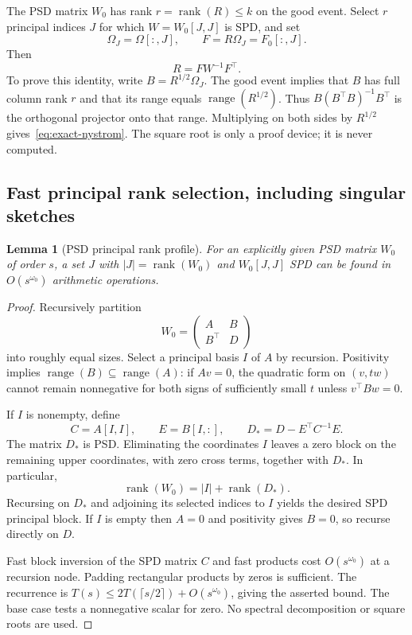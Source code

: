 \documentclass[11pt,a4paper]{article}
\newcommand{\rank}{\operatorname{rank}}
\newcommand{\range}{\operatorname{range}}
\newtheorem{lemma}[theorem]{Lemma}
\theoremstyle{definition}
\theoremstyle{remark}
\begin{document}
The PSD matrix $W_0$ has rank $r=\rank(R)\le k$ on the good event. Select $r$ principal indices $J$ for which $W=W_0[J,J]$ is SPD, and set
\[
 \Omega_J=\Omega[:,J],\qquad F=R\Omega_J=F_0[:,J].
\]
Then
\begin{equation}
 R=FW^{-1}F^\top. \label{eq:exact-nystrom}
\end{equation}
To prove this identity, write $B=R^{1/2}\Omega_J$. The good event implies that $B$ has full column rank $r$ and that its range equals $\range(R^{1/2})$. Thus $B(B^\top B)^{-1}B^\top$ is the orthogonal projector onto that range. Multiplying on both sides by $R^{1/2}$ gives~\eqref{eq:exact-nystrom}. The square root is only a proof device; it is never computed.

\subsection{Fast principal rank selection, including singular sketches}
\begin{lemma}[PSD principal rank profile]
\label{lem:rankprofile}
For an explicitly given PSD matrix $W_0$ of order $s$, a set $J$ with $|J|=\rank(W_0)$ and $W_0[J,J]$ SPD can be found in $O(s^{\omega_0})$ arithmetic operations.
\end{lemma}
\begin{proof}
Recursively partition
\[
 W_0=\begin{pmatrix}A&B\\B^\top&D\end{pmatrix}
\]
into roughly equal sizes. Select a principal basis $I$ of $A$ by recursion. Positivity implies $\range(B)\subseteq\range(A)$: if $Av=0$, the quadratic form on $(v,tw)$ cannot remain nonnegative for both signs of sufficiently small $t$ unless $v^\top Bw=0$.

If $I$ is nonempty, define
\[
 C=A[I,I],\qquad E=B[I,:],\qquad D_*=D-E^\top C^{-1}E.
\]
The matrix $D_*$ is PSD. Eliminating the coordinates $I$ leaves a zero block on the remaining upper coordinates, with zero cross terms, together with $D_*$. In particular,
\[
 \rank(W_0)=|I|+\rank(D_*).
\]
Recursing on $D_*$ and adjoining its selected indices to $I$ yields the desired SPD principal block. If $I$ is empty then $A=0$ and positivity gives $B=0$, so recurse directly on $D$.

Fast block inversion of the SPD matrix $C$ and fast products cost $O(s^{\omega_0})$ at a recursion node. Padding rectangular products by zeros is sufficient. The recurrence is
$T(s)\le2T(\lceil s/2\rceil)+O(s^{\omega_0})$, giving the asserted bound. The base case tests a nonnegative scalar for zero. No spectral decomposition or square roots are used.
\end{proof}
\end{document}
